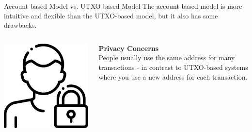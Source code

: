 \documentclass[handout]{beamer}
\begin{document}
\begin{frame}{Account-based Model vs. UTXO-based Model}
	The account-based model is more intuitive and flexible than the UTXO-based model, but it also has some drawbacks. \\ 
	\vspace{2em}
		\begin{columns}[T]
			\begin{column}{0.25\textwidth}
				\center
				\includegraphics[scale=0.1]{../assets/images/privacy.png}
			\end{column}
			\begin{column}{0.8\textwidth}
				\textbf{Privacy Concerns}\\
People usually use the same address for many transactions - in contrast to UTXO-based systems where you use a new address for each transaction. \\
\href{https://etherscan.io/address/0x8cbcb10a365a5e26dfcd41b1257fda54bc604c70}{}
			\end{column}
		\end{columns}	
\end{frame}
\end{document}

